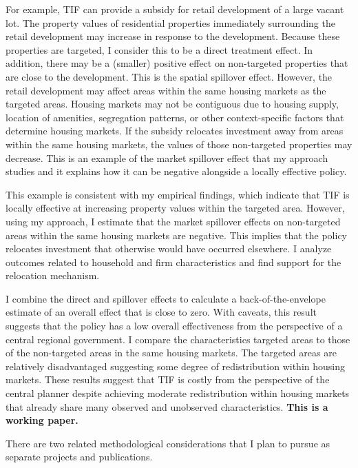For example, TIF can provide a subsidy for retail development of a large vacant lot. The property values of residential properties immediately surrounding the retail development may increase in response to the development. Because these properties are targeted, I consider this to be a direct treatment effect. In addition, there may be a (smaller) positive effect on non-targeted properties that are close to the development. This is the spatial spillover effect. However, the retail development may affect areas within the same housing markets as the targeted areas. Housing markets may not be contiguous due to housing supply, location of amenities, segregation patterns, or other context-specific factors that determine housing markets. If the subsidy relocates investment away from areas within the same housing markets, the values of those non-targeted properties may decrease. This is an example of the market spillover effect that my approach studies and it explains how it can be negative alongside a locally effective policy.

This example is consistent with my empirical findings, which indicate that TIF is locally effective at increasing property values within the targeted area. However, using my approach, I estimate that the market spillover effects on non-targeted areas within the same housing markets are negative. This implies that the policy relocates investment that otherwise would have occurred elsewhere. I analyze outcomes related to household and firm characteristics and find support for the relocation mechanism. 

I combine the direct and spillover effects to calculate a back-of-the-envelope estimate of an overall effect that is close to zero. With caveats, this result suggests that the policy has a low overall effectiveness from the perspective of a central regional government. I compare the characteristics targeted areas to those of the non-targeted areas in the same housing markets. The targeted areas are relatively disadvantaged suggesting some degree of redistribution within housing markets. These results suggest that TIF is costly from the perspective of the central planner despite achieving moderate redistribution within housing markets that already share many observed and unobserved characteristics. \textbf{This is a working paper.}

There are two related methodological considerations that I plan to pursue as separate projects and publications.

